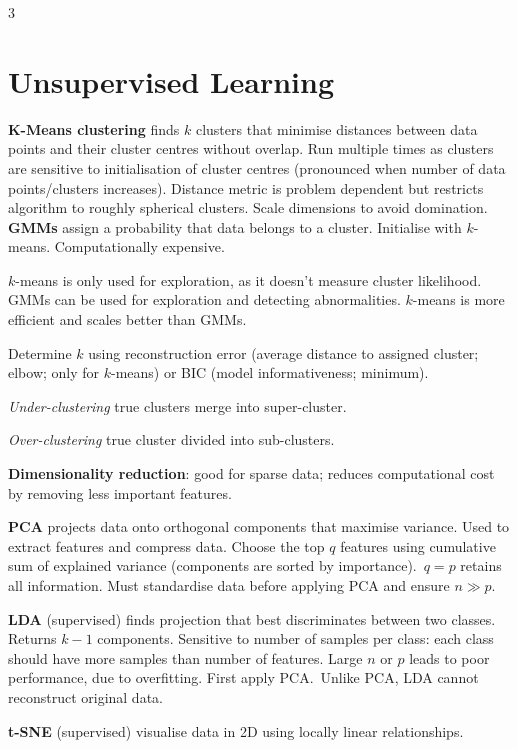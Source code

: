 \documentclass{article}
\begin{document}
\begin{multicols}{3}
    \section{Unsupervised Learning}
    \textbf{K-Means clustering} finds \(k\) clusters that minimise
    distances between data points and their cluster centres without overlap.
    Run multiple times as clusters are sensitive to initialisation of cluster centres
    (pronounced when number of data points/clusters increases).
    Distance metric is problem dependent but restricts algorithm to roughly
    spherical clusters. Scale dimensions to avoid domination.
    \textbf{GMMs} assign a probability that data belongs to
    a cluster. Initialise with \(k\)-means. Computationally expensive.

    \(k\)-means is only used for exploration, as it doesn't measure cluster
    likelihood. GMMs can be used for exploration and detecting abnormalities.
    \(k\)-means is more efficient and scales better than GMMs.

    Determine \(k\) using reconstruction error (average distance to
    assigned cluster; elbow; only for \(k\)-means) or BIC (model
    informativeness; minimum).

    \textit{Under-clustering} true clusters merge into super-cluster.

    \textit{Over-clustering} true cluster divided into sub-clusters.

    \textbf{Dimensionality reduction}: good for sparse data; reduces
    computational cost by removing less important features.

    \textbf{PCA} projects data onto orthogonal components that maximise
    variance. Used to extract features and compress data.
    Choose the top \(q\) features using cumulative sum of explained
    variance (components are sorted by importance).\ \(q = p\) retains
    all information. Must standardise data before applying PCA and
    ensure \(n \gg p\).

    \textbf{LDA} (supervised) finds projection
    that best discriminates between two classes. Returns \(k - 1\) components.
    Sensitive to number of samples per class: each class should have more
    samples than number of features. Large \(n\) or \(p\) leads to poor
    performance, due to overfitting. First apply PCA.\ Unlike PCA, LDA
    cannot reconstruct original data.

    \textbf{t-SNE} (supervised) visualise data in 2D
    using locally linear relationships.


\end{multicols}
\end{document}
